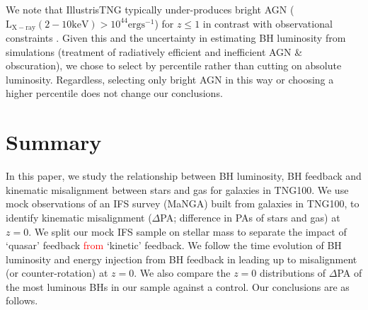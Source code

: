 \documentclass[fleqn,usenatbib]{mnras}
\newcommand{\red}[1]{{\textcolor{red}{#1}}}
\begin{document}
We note that IllustrisTNG typically under-produces bright AGN ($\mathrm{L_{X-ray}(2-10 keV) > 10^{44}ergs^{-1}}$) for $z \leq 1$ in contrast with observational constraints \citep[see][]{habouzit2019}. Given this and the uncertainty in estimating BH luminosity from simulations (treatment of radiatively efficient and inefficient AGN \& obscuration), we chose to select by percentile rather than cutting on absolute luminosity. Regardless, selecting only bright AGN in this way or choosing a higher percentile does not change our conclusions.

\section{Summary} \label{sec:conclusion}

In this paper, we study the relationship between BH luminosity, BH feedback and kinematic misalignment between stars and gas for galaxies in TNG100. We use mock observations of an IFS survey (MaNGA) built from galaxies in TNG100, to identify kinematic misalignment ($\Delta$PA; difference in PAs of stars and gas) at $z=0$. We split our mock IFS sample on stellar mass to separate the impact of `quasar' feedback \red{from} `kinetic' feedback. We follow the time evolution of BH luminosity and energy injection from BH feedback in leading up to misalignment (or counter-rotation) at $z=0$. We also compare the $z=0$ distributions of $\Delta$PA of the most luminous BHs in our sample against a control. Our conclusions are as follows.
\end{document}
